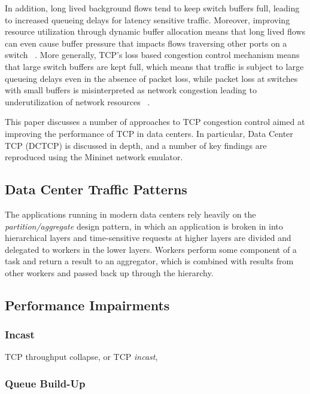 In addition, long lived background flows tend to keep switch buffers full, leading to increased queueing delays for latency sensitive traffic. Moreover, improving resource utilization through dynamic buffer allocation means that long lived flows can even cause buffer pressure that impacts flows traversing other ports on a switch ~\cite{alizadeh_data_2010}. More generally, TCP's loss based congestion control mechanism means that large switch buffers are kept full, which means that traffic is subject to large queueing delays even in the absence of packet loss, while packet loss at switches with small buffers is misinterpreted as network congestion leading to underutilization of network resources ~\cite{cardwell_bbr:_2016}.

This paper discusses a number of approaches to TCP congestion control aimed at improving the performance of TCP in data centers. In particular, Data Center TCP (DCTCP) is discussed in depth, and a number of key findings are reproduced using the Mininet network emulator.

\subsection{Data Center Traffic Patterns}

The applications running in modern data centers rely heavily on the \emph{partition/aggregate} design pattern, in which an application is broken in into hierarchical layers and time-sensitive requests at higher layers are divided and delegated to workers in the lower layers. Workers perform some component of a task and return a result to an aggregator, which is combined with results from other workers and passed back up through the hierarchy. 

\subsection{Performance Impairments}

\subsubsection{Incast}

TCP throughput collapse, or TCP \emph{incast},  

\subsubsection{Queue Build-Up}

